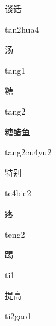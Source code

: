 \begin{multicols*}{2}
\begin{verbete}{谈话}
\begin{pronuncia}{tan2hua4}
\end{pronuncia}
\end{verbete}

\begin{verbete}[tang1]{汤}
\begin{pronuncia}{tang1}
\end{pronuncia}
\end{verbete}

\begin{verbete}[tang2]{糖}
\begin{pronuncia}{tang2}
\end{pronuncia}
\end{verbete}

\begin{verbete}[tang2cu4yu2]{糖醋鱼}
\begin{pronuncia}{tang2cu4yu2}
\end{pronuncia}
\end{verbete}

\begin{verbete}[te4bie2]{特别}
\begin{pronuncia}{te4bie2}
\end{pronuncia}
\end{verbete}

\begin{verbete}[teng2]{疼}
\begin{pronuncia}{teng2}
\end{pronuncia}
\end{verbete}

\begin{verbete}[ti1]{踢}
\begin{pronuncia}{ti1}
\end{pronuncia}
\end{verbete}

\begin{verbete}[ti2gao1]{提高}
\begin{pronuncia}{ti2gao1}
\end{pronuncia}
\end{verbete}


\end{multicols*}
